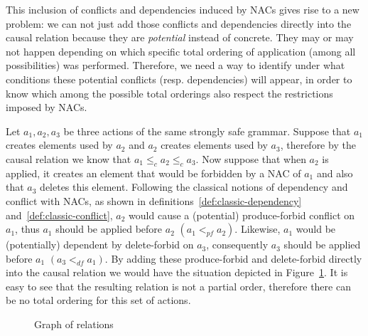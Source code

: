 This inclusion of conflicts and dependencies induced by NACs gives rise to a new problem: we can not just add those conflicts and dependencies directly into the causal relation because they are \textit{potential} instead of concrete. They may or may not happen depending on which specific total ordering of application (among all possibilities) was performed. Therefore, we need a way to identify under what conditions these potential conflicts (resp. dependencies) will appear, in order to know which among the possible total orderings also respect the restrictions imposed by NACs.

\begin{example}
Let $a_1, a_2, a_3$ be three actions of the same strongly safe grammar. Suppose that $a_1$ creates elements used by $a_2$ and $a_2$ creates elements used by $a_3$, therefore by the causal relation we know that $a_1 \leq_c a_2 \leq_c a_3$. Now suppose that when $a_2$ is applied, it creates an element that would be forbidden by a NAC of $a_1$ and also that $a_3$ deletes this element. Following the classical notions of dependency and conflict with NACs, as shown in
  definitions~\ref{def:classic-dependency} and~\ref{def:classic-conflict}, $a_2$ would cause a (potential) produce-forbid conflict on $a_1$, thus $a_1$ should be applied before $a_2$ $(a_1 <_{pf} a_2)$. Likewise, $a_1$ would be (potentially) dependent by delete-forbid on $a_3$, consequently $a_3$ should be applied before $a_1$ $(a_3 <_{df} a_1)$. By adding these produce-forbid and delete-forbid directly into the causal relation we would have the situation depicted in Figure~\ref{fig:process:order:occurrence-relation-fail}. It is easy to see that the resulting relation is not a partial order, therefore there can be no total ordering for this set of actions.
\begin{figure}[!ht]
  \centering
  \caption{Graph of relations}\label{fig:process:order:occurrence-relation-fail}
\end{figure}


\end{example}
